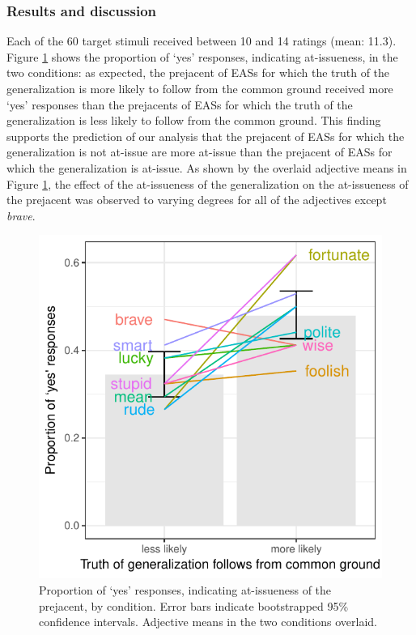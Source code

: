 \documentclass[11pt,fleqn]{article}
\newcommand{\6}{\mbox{$[\hspace*{-.6mm}[$}}
\newcommand{\9}{\mbox{$]\hspace*{-.6mm}]$}}
\begin{document}
\subsubsection{Results and discussion}

Each of the 60 target stimuli received between 10 and 14 ratings (mean: 11.3).  Figure \ref{f-ai-by-adj} shows the proportion of `yes' responses, indicating at-issueness, in the two conditions:  as expected, the prejacent of EASs for which the truth of the generalization is more likely to follow from the common ground received more `yes' responses than the prejacents of EASs for which the truth of the generalization is less likely to follow from the common ground. This finding supports the prediction of our analysis that the prejacent of EASs for which the generalization is not at-issue are more at-issue than the prejacent of EASs for which the generalization is at-issue. As shown by the overlaid adjective means in Figure \ref{f-ai-by-adj}, the effect of the at-issueness of the generalization on the at-issueness of the prejacent was observed to varying degrees for all of the adjectives except {\em brave}.

\begin{figure}[H]
\begin{center}
\includegraphics[scale=.85]{../exp3-at-issueness/graphs/proportion-ai-by-condition}

\caption{Proportion of `yes' responses, indicating at-issueness of the prejacent, by condition. Error bars indicate bootstrapped 95\% confidence intervals. Adjective means in the two conditions overlaid.}\label{f-ai-by-adj}
\end{center}
\end{figure}
\end{document}
